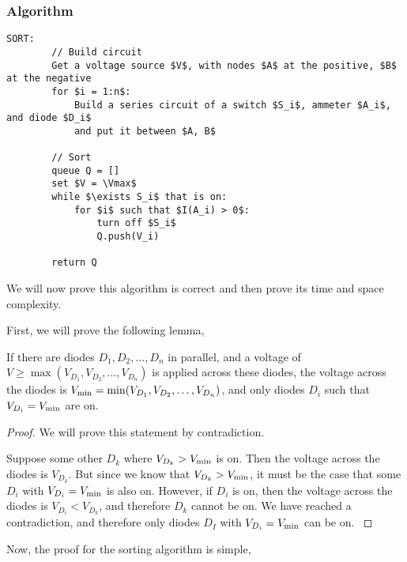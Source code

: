\documentclass{article}
\begin{document}
\subsubsection{Algorithm}

\begin{lstlisting}[label={alg:sort}]
	SORT:
		// Build circuit
		Get a voltage source $V$, with nodes $A$ at the positive, $B$ at the negative
		for $i = 1:n$:
			Build a series circuit of a switch $S_i$, ammeter $A_i$, and diode $D_i$
			and put it between $A, B$

		// Sort
		queue Q = []
		set $V = \Vmax$
		while $\exists S_i$ that is on:
			for $i$ such that $I(A_i) > 0$:
				turn off $S_i$
				Q.push(V_i)

		return Q
\end{lstlisting}

We will now prove this algorithm is correct and then prove its time and space complexity.

First, we will prove the following lemma,

\begin{lemma}
	If there are diodes $D_1, D_2, \dots, D_n$ in parallel, and a voltage of $V
	\geq \max(V_{D_1}, V_{D_2}, \dots, V_{D_n})$ is applied across these diodes,
	the voltage across the diodes is $V_\text{min} = \min(V_{D_1}, V_{D_2}, \dots, V_{D_n})$,
	and only diodes $D_i$ such that $V_{D_i} = V_\text{min}$ are on.
\end{lemma}

\begin{proof}
	We will prove this statement by contradiction.

	Suppose some other $D_k$ where $V_{D_k} > V_\text{min}$ is on. Then the voltage
	across the diodes is $V_{D_k}$. But since we know that $V_{D_k} >
	V_\text{min}$, it must be the case that some $D_i$ with $V_{D_i} = V_\text{min}$ is also
	on. However, if $D_i$ is on, then the voltage across the diodes is $V_{D_i}
	< V_{D_k}$, and therefore $D_k$ cannot be on. We have reached a
	contradiction, and therefore only diodes $D_I$ with $V_{D_i} = V_\text{min}$ can
	be on.
	\label{lemma:smallest_diode}
\end{proof}

Now, the proof for the sorting algorithm is simple,
\end{document}
